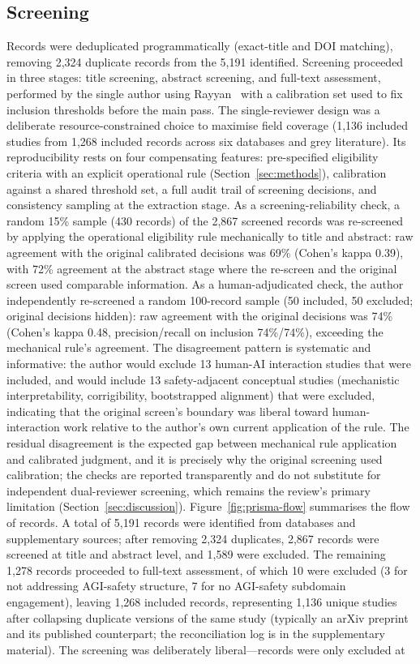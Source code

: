 \subsection{Screening}
Records were deduplicated programmatically (exact-title and DOI matching), removing 2,324 duplicate records from the 5,191 identified. Screening proceeded in three stages: title screening, abstract screening, and full-text assessment, performed by the single author using Rayyan~\cite{ouzzani2016rayyan} with a calibration set used to fix inclusion thresholds before the main pass. The single-reviewer design was a deliberate resource-constrained choice to maximise field coverage (1,136 included studies from 1,268 included records across six databases and grey literature). Its reproducibility rests on four compensating features: pre-specified eligibility criteria with an explicit operational rule (Section~\ref{sec:methods}), calibration against a shared threshold set, a full audit trail of screening decisions, and consistency sampling at the extraction stage. As a screening-reliability check, a random 15\% sample (430 records) of the 2,867 screened records was re-screened by applying the operational eligibility rule mechanically to title and abstract: raw agreement with the original calibrated decisions was 69\% (Cohen's kappa 0.39), with 72\% agreement at the abstract stage where the re-screen and the original screen used comparable information. As a human-adjudicated check, the author independently re-screened a random 100-record sample (50 included, 50 excluded; original decisions hidden): raw agreement with the original decisions was 74\% (Cohen's kappa 0.48, precision/recall on inclusion 74\%/74\%), exceeding the mechanical rule's agreement. The disagreement pattern is systematic and informative: the author would exclude 13 human-AI interaction studies that were included, and would include 13 safety-adjacent conceptual studies (mechanistic interpretability, corrigibility, bootstrapped alignment) that were excluded, indicating that the original screen's boundary was liberal toward human-interaction work relative to the author's own current application of the rule. The residual disagreement is the expected gap between mechanical rule application and calibrated judgment, and it is precisely why the original screening used calibration; the checks are reported transparently and do not substitute for independent dual-reviewer screening, which remains the review's primary limitation (Section~\ref{sec:discussion}). Figure~\ref{fig:prisma-flow} summarises the flow of records. A total of 5,191 records were identified from databases and supplementary sources; after removing 2,324 duplicates, 2,867 records were screened at title and abstract level, and 1,589 were excluded. The remaining 1,278 records proceeded to full-text assessment, of which 10 were excluded (3 for not addressing AGI-safety structure, 7 for no AGI-safety subdomain engagement), leaving 1,268 included records, representing 1,136 unique studies after collapsing duplicate versions of the same study (typically an arXiv preprint and its published counterpart; the reconciliation log is in the supplementary material). The screening was deliberately liberal---records were only excluded at 
